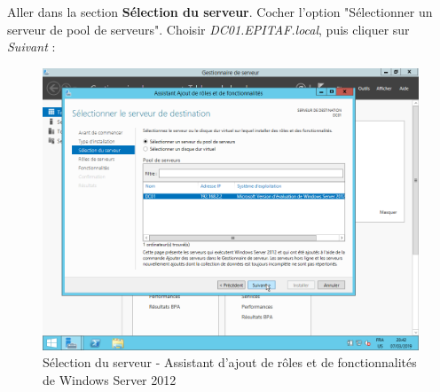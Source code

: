 \newpage
Aller dans la section \textbf{Sélection du serveur}. Cocher l'option "Sélectionner un serveur de pool de serveurs". Choisir \textit{DC01.EPITAF.local}, puis cliquer sur \textit{Suivant} :
\begin{figure}[h!]
    \begin{center}
        \includegraphics[scale=0.6]{WS2012_Screenshots/20.png}
        \caption{Sélection du serveur - Assistant d'ajout de rôles et de fonctionnalités de Windows Server 2012}
        \label{WS2012_Screenshots/20}
    \end{center}
\end{figure}
\FloatBarrier

